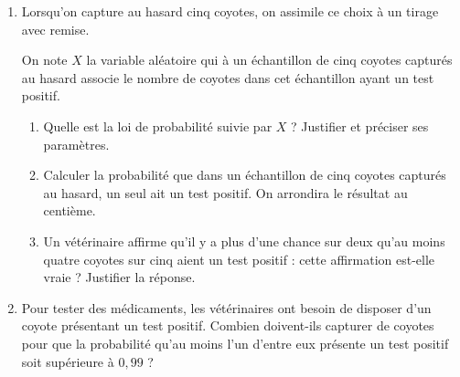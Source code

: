 \documentclass[10pt]{article}
\begin{document}
\begin{enumerate}
\item Lorsqu'on capture au hasard cinq coyotes, on assimile ce choix à un tirage avec remise.

On note $X$ la variable aléatoire qui à un échantillon de cinq coyotes capturés au hasard associe le nombre de coyotes dans cet échantillon ayant un test positif.
\begin{enumerate}
\item Quelle est la loi de probabilité suivie par $X$ ? Justifier et préciser ses paramètres.
\item Calculer la probabilité que dans un échantillon de cinq coyotes capturés au hasard, un seul ait un test positif. On arrondira le résultat au centième.
\item Un vétérinaire affirme qu'il y a plus d'une chance sur deux qu'au moins quatre coyotes sur cinq aient un test positif : cette affirmation est-elle vraie ? Justifier la réponse.
	\end{enumerate}	
\item Pour tester des médicaments, les vétérinaires ont besoin de disposer d'un coyote présentant un test positif. Combien doivent-ils capturer de coyotes pour que la probabilité qu'au moins l'un d'entre eux présente un test positif soit supérieure à $0,99$ ?
\end{enumerate}

\bigskip
\end{document}
